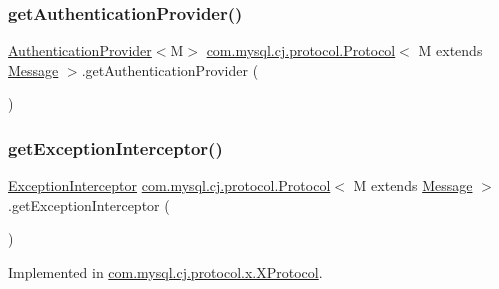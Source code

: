 \subsubsection{\texorpdfstring{get\+Authentication\+Provider()}{getAuthenticationProvider()}}
{\footnotesize\ttfamily \mbox{\hyperlink{interfacecom_1_1mysql_1_1cj_1_1protocol_1_1_authentication_provider}{Authentication\+Provider}}$<$M$>$ \mbox{\hyperlink{interfacecom_1_1mysql_1_1cj_1_1protocol_1_1_protocol}{com.\+mysql.\+cj.\+protocol.\+Protocol}}$<$ M extends \mbox{\hyperlink{interfacecom_1_1mysql_1_1cj_1_1protocol_1_1_message}{Message}} $>$.get\+Authentication\+Provider (\begin{DoxyParamCaption}{ }\end{DoxyParamCaption})}

\mbox{\label{interfacecom_1_1mysql_1_1cj_1_1protocol_1_1_protocol_a788184c5580bc30795094cefce935156}} 
\subsubsection{\texorpdfstring{get\+Exception\+Interceptor()}{getExceptionInterceptor()}}
{\footnotesize\ttfamily \mbox{\hyperlink{interfacecom_1_1mysql_1_1cj_1_1exceptions_1_1_exception_interceptor}{Exception\+Interceptor}} \mbox{\hyperlink{interfacecom_1_1mysql_1_1cj_1_1protocol_1_1_protocol}{com.\+mysql.\+cj.\+protocol.\+Protocol}}$<$ M extends \mbox{\hyperlink{interfacecom_1_1mysql_1_1cj_1_1protocol_1_1_message}{Message}} $>$.get\+Exception\+Interceptor (\begin{DoxyParamCaption}{ }\end{DoxyParamCaption})}



Implemented in \mbox{\hyperlink{classcom_1_1mysql_1_1cj_1_1protocol_1_1x_1_1_x_protocol_a79956bf3488c1946b49ff09ad2646bd4}{com.\+mysql.\+cj.\+protocol.\+x.\+X\+Protocol}}.

\mbox{\label{interfacecom_1_1mysql_1_1cj_1_1protocol_1_1_protocol_a14849c71b76edabc8dae60d7c22d9fee}} 
